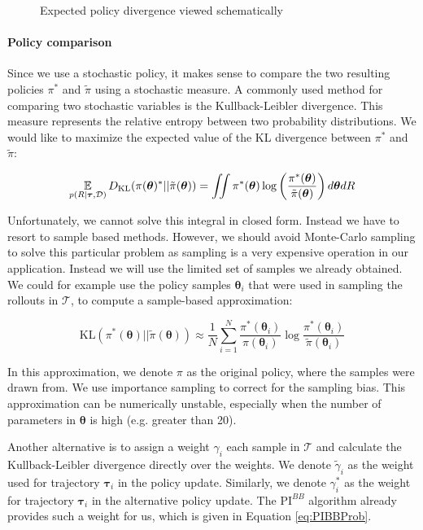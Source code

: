\documentclass[mscThesis.tex]{subfiles}
\begin{document}
\begin{figure}[!ht]
\begin{tikzpicture}[->, >=stealth']
 		
\end{tikzpicture}
\caption{Expected policy divergence viewed schematically}
\label{fig:epd}
\end{figure}


\paragraph{Policy comparison}
Since we use a stochastic policy, it makes sense to compare the two resulting policies $\pi^*$ and $\tilde{\pi}$ using a stochastic measure. A commonly used method for comparing two stochastic variables is the Kullback-Leibler divergence. This measure represents the relative entropy between two probability distributions. We would like to maximize the expected value of the KL divergence between $\pi^*$ and $\tilde{\pi}$:

\begin{equation*}
    \E_{p(R|\bm{\tau}, \mathcal{D})} D_{\text{KL}}(\pi(\bm{\theta})^*||\tilde{\pi} (\bm{\theta})) = \iint \pi^* (\bm{\theta}) \log \left( \frac{\pi^* (\bm{\theta})}{\tilde{\pi} (\bm{\theta})} \right) d \bm{\theta} d R
\end{equation*}

Unfortunately, we cannot solve this integral in closed form. Instead we have to resort to sample based methods. However, we should avoid Monte-Carlo sampling to solve this particular problem as sampling is a very expensive operation in our application. Instead we will use the limited set of samples we already obtained. We could for example use the policy samples $\bm{\theta}_i$ that were used in sampling the rollouts in $\mathcal{T}$, to compute a sample-based approximation:


\begin{equation*}
    \text{KL}(\pi^* (\bm{\theta})||\tilde{\pi} (\bm{\theta})) \approx \frac{1}{N} \sum_{i=1}^N \frac{\pi^* (\bm{\theta}_i)}{\pi (\bm{\theta}_i)} \log \frac{\pi^* (\bm{\theta}_i)}{\tilde{\pi}(\bm{\theta}_i)}
\end{equation*}

In this approximation, we denote $\pi$ as the original policy, where the samples were drawn from. We use importance sampling to correct for the sampling bias. This approximation can be numerically unstable, especially when the number of parameters in $\bm{\theta}$ is high (e.g. greater than 20).

Another alternative is to assign a weight $\gamma_i$ each sample in $\mathcal{T}$ and calculate the Kullback-Leibler divergence directly over the weights. We denote $\tilde{\gamma}_i$ as the weight used for trajectory $\bm{\tau}_i$ in the policy update. Similarly, we denote $\gamma^*_i$ as the weight for trajectory $\bm{\tau}_i$ in the alternative policy update. The $\text{PI}^{BB}$ algorithm already provides such a weight for us, which is given in Equation \ref{eq:PIBBProb}.
\end{document}
